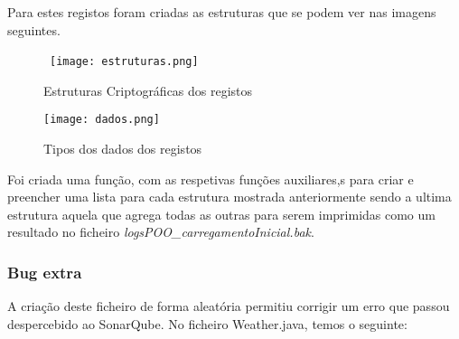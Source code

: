 \par Para estes registos foram criadas as estruturas que se podem ver nas imagens seguintes.\newline

\begin{figure}[H]

  \centering

  \hbox{\hspace{-5em} \texttt{[image: estruturas.png]}}

  \caption {Estruturas Criptográficas dos registos}

  \label {fig45}
\end{figure}
\newpage
\begin{figure}[H]
  \centering

  \texttt{[image: dados.png]}

  \caption {Tipos dos dados dos registos}

  \label {fig46}
\end{figure}

\par Foi criada uma função, com as respetivas funções auxiliares,s para criar e preencher uma lista para cada estrutura mostrada anteriormente sendo a ultima estrutura aquela que agrega todas as outras para serem imprimidas como um resultado no ficheiro \textit{logsPOO\_carregamentoInicial.bak}.\newline


\subsubsection{Bug extra}\hfill
\newline
\par A criação deste ficheiro de forma aleatória permitiu corrigir um erro que passou despercebido ao SonarQube. No ficheiro Weather.java, temos o seguinte:\newline
\hfill\newline

